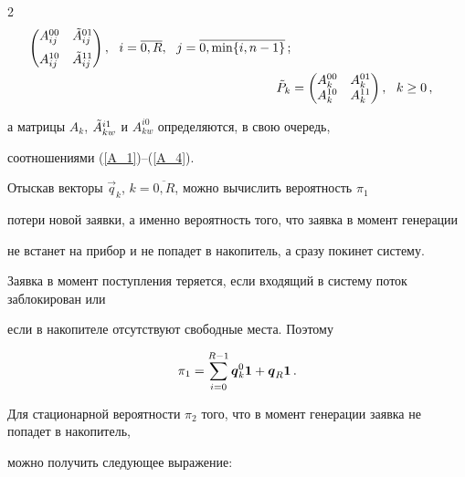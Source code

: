 \begin{multicols}{2}
\begin{align*}
\begin{pmatrix}
A_{ij}^{00} & \Tilde A_{ij}^{01} \\[6pt]


A_{ij}^{10} & \Tilde A_{ij}^{11} \\


\end{pmatrix},


\ \ i=\overline{0,R},\ \ j=\overline{0,\min\{i,n-1\}}\,;


\\


\Tilde P_k &=


\begin{pmatrix}


A_k^{00} & A_k^{01} \\


A_k^{10} & A_k^{11} \\


\end{pmatrix},


\ \ k\ge 0\,,


\end{align*}


а матрицы $A_k$, $\Tilde A^{i1}_{kw}$  и $A^{i0}_{kw}$ определяются, в свою очередь,


соотношениями (\ref{A_1})--(\ref{A_4}).





Отыскав векторы $\vec{q}_k$, $k=\overline{0,R}$, можно вычислить вероятность $\pi_1$


потери новой заявки, а именно вероятность того, что заявка в момент генерации


не встанет на прибор и не попадет в накопитель, а сразу покинет систему.


Заявка в момент поступления теряется, если входящий в систему поток заблокирован или


если в накопителе отсутствуют свободные места. Поэтому


\begin{equation}


\label{pi_1}


\pi_1 = \sum\limits_{i=0}^{R-1}\vec{q}^0_k {\bf 1}+ \vec{q}_R {\bf 1}\,.


\end{equation}


Для стационарной вероятности $\pi_2$ того, что в момент генерации заявка не попадет в накопитель,


можно получить следующее выражение:


\begin{equation}



\end{equation}
\end{multicols}
